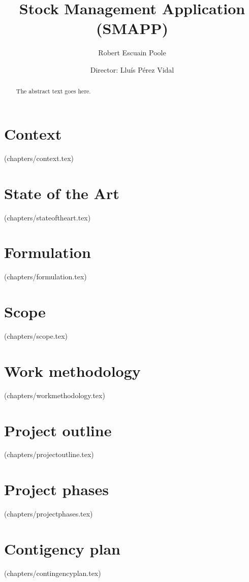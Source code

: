 \documentclass{report}
\begin{document}
    \frontmatter
        \title{Stock Management Application (SMAPP)}
        \author{Robert Escuain Poole}
        \author{Director: Lluís Pérez Vidal}
        \maketitle

        \begin{abstract}
        The abstract text goes here.
        \end{abstract}

    \mainmatter
        \chapter{Context}
        (chapters/context.tex)
        
        \chapter{State of the Art}
        (chapters/stateoftheart.tex)
        
        \chapter{Formulation}
        (chapters/formulation.tex)
        
        \chapter{Scope}
        (chapters/scope.tex)
        
        \chapter{Work methodology}
        (chapters/workmethodology.tex)
        
        \chapter{Project outline}
        (chapters/projectoutline.tex)
        
        \chapter{Project phases}
        (chapters/projectphases.tex)
        
        \chapter{Contigency plan}
        (chapters/contingencyplan.tex)
        
\end{document}
